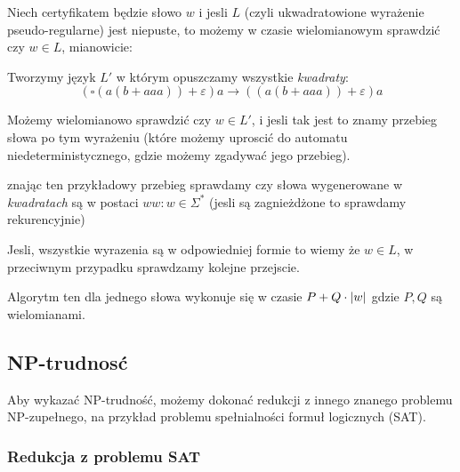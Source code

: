 \documentclass[11pt]{scrartcl}
\begin{document}
      Niech certyfikatem będzie słowo $w$ i jesli $L$ (czyli ukwadratowione wyrażenie pseudo-regularne) jest niepuste, to możemy w czasie wielomianowym sprawdzić czy $w \in L$, mianowicie:
      \begin{walk}
          \item Tworzymy język $L'$ w którym opuszczamy wszystkie \textit{kwadraty}:
            \[
              \left ( \square \left ( a (b + aaa) \right ) + \varepsilon \right ) a \rightarrow \left ( \left ( a (b + aaa) \right ) + \varepsilon \right )a
            \]
          \item Możemy wielomianowo sprawdzić czy $w \in L'$, i jesli tak jest to znamy przebieg słowa po tym wyrażeniu (które możemy uproscić do automatu niedeterministycznego, gdzie możemy zgadywać jego przebieg).
          \item znając ten przykładowy przebieg sprawdamy czy słowa wygenerowane w \textit{kwadratach} są w postaci $ww : w \in \Sigma^*$ (jesli są zagnieżdżone to sprawdamy rekurencyjnie)
          \item Jesli, wszystkie wyrazenia są w odpowiedniej formie to wiemy że $w \in L$, w przeciwnym przypadku sprawdzamy kolejne przejscie.
      \end{walk}
          Algorytm ten dla jednego słowa wykonuje się w czasie $P + Q \cdot \left\lvert w \right\rvert$ gdzie $P, Q$ są wielomianami. 
      

      \subsection*{NP-trudnosć}

      Aby wykazać NP-trudność, możemy dokonać redukcji z innego znanego problemu NP-zupełnego, na przykład problemu spełnialności formuł logicznych (SAT).

\subsubsection*{Redukcja z problemu SAT}
\end{document}
